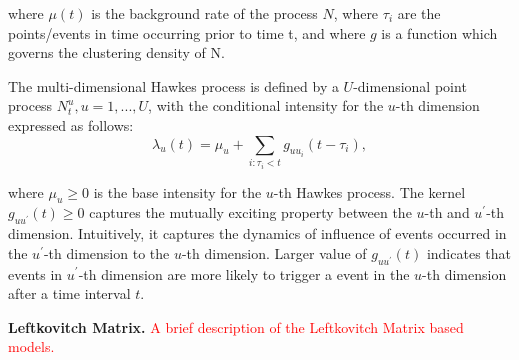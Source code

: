 where $\mu(t)$ is the background rate of the process  $N$, where $\tau_i$ are the points/events in time occurring prior to time t, and where $g$ is a function which governs the clustering density of N. 

The multi-dimensional Hawkes process is defined by a $U$-dimensional point process $N_t^u, u =1, . . . , U$, with the conditional intensity for the $u$-th dimension expressed as follows:
$$\lambda_u(t) = \mu_u + \sum_{i:\tau_i<t} g_{uu_i}(t-\tau_i),$$

where $\mu_u \ge 0$ is the base intensity for the $u$-th Hawkes process. The kernel $g_{uu^\prime}(t) \ge 0$ captures the mutually exciting property between the $u$-th and $u^\prime$-th dimension. Intuitively, it captures the dynamics of influence of events occurred in the $u^\prime$-th dimension to the $u$-th dimension. Larger value of $g_{uu^\prime}(t)$  indicates that events in $u^\prime$-th dimension are more likely to trigger a event in the $u$-th dimension after a time interval $t$.

\textbf{Leftkovitch Matrix.} \textcolor{red}{A brief description of the Leftkovitch Matrix based models.}
\fi


